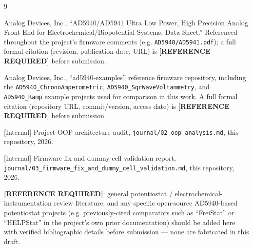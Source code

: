 \documentclass[journal]{IEEEtran}
\begin{document}
\begin{thebibliography}{9}

Analog Devices, Inc., ``AD5940/AD5941 Ultra Low Power, High Precision Analog Front End for Electrochemical/Biopotential Systems, Data Sheet.'' Referenced throughout the project's firmware comments (e.g. \texttt{AD5940/AD5941.pdf}); a full formal citation (revision, publication date, URL) is \textbf{[REFERENCE REQUIRED]} before submission.

Analog Devices, Inc., ``ad5940-examples'' reference firmware repository, including the \texttt{AD5940\_ChronoAmperometric}, \texttt{AD5940\_SqrWaveVoltammetry}, and \texttt{AD5940\_Ramp} example projects used for comparison in this work. A full formal citation (repository URL, commit/version, access date) is \textbf{[REFERENCE REQUIRED]} before submission.

[Internal] Project OOP architecture audit, \texttt{journal/02\_oop\_analysis.md}, this repository, 2026.

[Internal] Firmware fix and dummy-cell validation report, \texttt{journal/03\_firmware\_fix\_and\_dummy\_cell\_validation.md}, this repository, 2026.

\textbf{[REFERENCE REQUIRED]}: general potentiostat / electrochemical-instrumentation review literature, and any specific open-source AD5940-based potentiostat projects (e.g. previously-cited comparators such as ``FreiStat'' or ``HELPStat'' in the project's own prior documentation) should be added here with verified bibliographic details before submission --- none are fabricated in this draft.

\end{thebibliography}
\end{document}

